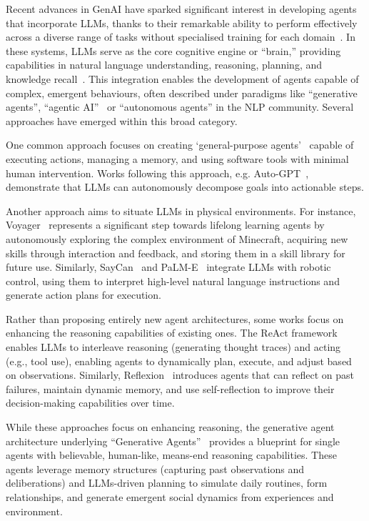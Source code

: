 Recent advances in \ac{GenAI} have sparked significant interest in developing agents that incorporate \acp{LLM},
thanks to their remarkable ability to perform effectively across a diverse range of tasks
without specialised training for each domain~\cite{BubeckCEHLKLPZ23}.
%
In these systems,
\acp{LLM} serve as the core cognitive engine or ``brain,''
providing capabilities in natural language understanding, reasoning, planning, and knowledge recall~\cite{ParkOCMLB23,SumersYN024,WangMFZYZCTCLZWW24}.
%
This integration enables the development of agents capable of complex, emergent behaviours,
often described under paradigms like ``generative agents'',
``agentic AI''~\cite{Murugesan25a} or ``autonomous agents'' in the \ac{NLP} community.
%
Several approaches have emerged within this broad category.

One common approach focuses on creating `general-purpose agents'~\cite{Murugesan25a}
capable of executing actions, managing a memory, and using software tools with minimal human intervention.
%
Works following this approach,
e.g. Auto-GPT~\cite{YangYH23},
demonstrate that \acp{LLM} can autonomously decompose goals into actionable steps.

Another approach aims to situate \acp{LLM} in physical environments.
%
For instance,
Voyager~\cite{WangX0MXZFA24} represents a significant step towards lifelong learning agents
by autonomously exploring the complex environment of Minecraft,
acquiring new skills through interaction and feedback,
and storing them in a skill library for future use.
%
Similarly,
SayCan~\cite{HazraMR24} and PaLM-E~\cite{DriessXSLCIWTVY23} integrate \acp{LLM} with robotic control,
using them to interpret high-level natural language instructions
and generate action plans for execution.

Rather than proposing entirely new agent architectures,
some works focus on enhancing the reasoning capabilities of existing ones.
%
The ReAct framework~\cite{YaoZYDSN023} enables \acp{LLM} to interleave reasoning
(generating thought traces)
and acting
(e.g., tool use),
enabling agents to dynamically plan, execute, and adjust based on observations.
%
Similarly,
Reflexion~\cite{ShinnCGNY23} introduces agents that can reflect on past failures,
maintain dynamic memory,
and use self-reflection to improve their decision-making capabilities over time.
%

While these approaches focus on enhancing reasoning,
the generative agent architecture underlying ``Generative Agents''~\cite{ParkOCMLB23}
provides a blueprint for single agents with believable, human-like, means-end reasoning capabilities.
%
These agents leverage memory structures
(capturing past observations and deliberations)
and \acp{LLM}-driven planning to simulate daily routines,
form relationships,
and generate emergent social dynamics from experiences and environment.

